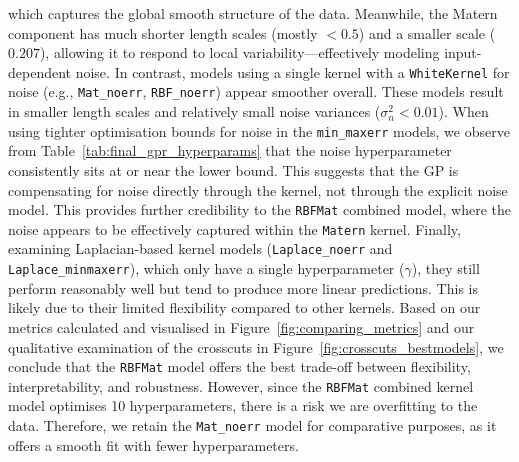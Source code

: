\documentclass[12pt]{article}
\begin{document}
which captures the global smooth structure of the data. Meanwhile, the Matern component has much shorter length scales (mostly $< 0.5$) and a smaller scale ($0.207$), allowing it to respond to local variability—effectively modeling input-dependent noise.
In contrast, models using a single kernel with a \texttt{WhiteKernel} for noise (e.g., \texttt{Mat\_noerr}, \texttt{RBF\_noerr}) appear smoother overall. These models result in smaller length scales and relatively small noise variances ($\sigma_n^2 < 0.01$).
When using tighter optimisation bounds for noise in the \texttt{min\_maxerr} models, we observe from Table~\ref{tab:final_gpr_hyperparams} that the noise hyperparameter consistently sits at or near the lower bound. 
This suggests that the GP is compensating for noise directly through the kernel, not through the explicit noise model. This provides further credibility to the \texttt{RBFMat} combined model, where the noise appears to be effectively captured within the \texttt{Matern} kernel.
Finally, examining Laplacian-based kernel models (\texttt{Laplace\_noerr} and \texttt{Laplace\_minmaxerr}), which only have a single hyperparameter ($\gamma$), they still perform reasonably well but tend to produce more linear predictions. This is likely due to their limited flexibility compared to other kernels.
Based on our metrics calculated and visualised in Figure~\ref{fig:comparing_metrics} and our qualitative examination of the crosscuts in Figure~\ref{fig:crosscuts_bestmodels}, we conclude that the \texttt{RBFMat} model offers the best trade-off between flexibility, interpretability, and robustness.
However, since the \texttt{RBFMat} combined kernel model optimises 10 hyperparameters, there is a risk we are overfitting to the data. Therefore, we retain the \texttt{Mat\_noerr} model for comparative purposes, as it offers a smooth fit with fewer hyperparameters.
\end{document}
